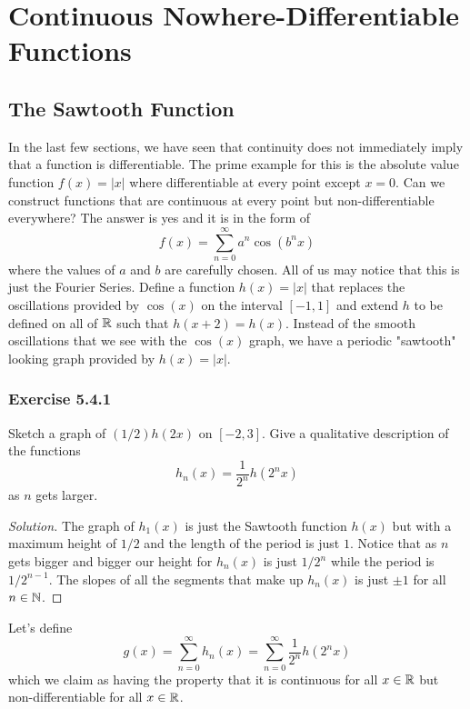 \section{Continuous Nowhere-Differentiable Functions}

\subsection{The Sawtooth Function}

In the last few sections, we have seen that continuity does not immediately imply that a function is differentiable. The prime example for this is the absolute value function \( f(x) = | x  |  \) where differentiable at every point except \(  x = 0  \). Can we construct functions that are continuous at every point but non-differentiable everywhere? The answer is yes and it is in the form of 
\[  f(x) = \sum_{ n = 0 }^{ \infty  } a^n \cos(b^n x) \] where the values of \( a  \) and \( b  \) are carefully chosen. All of us may notice that this is just the Fourier Series. Define a function \( h(x) = | x |  \) that replaces the oscillations provided by \( \cos(x)  \) on the interval \( [-1,1] \) and extend \( h  \) to be defined on all of \( \mathbb{R}  \) such that \( h(x+2) = h(x)   \). Instead of the smooth oscillations that we see with the \( \cos (x)  \) graph, we have a periodic "sawtooth" looking graph provided by \( h(x) = | x |  \).

\subsubsection{Exercise 5.4.1} Sketch a graph of \( (1/2) h(2x)  \) on \( [-2,3]  \). Give a qualitative description of the functions 
\[  h_n(x) = \frac{ 1 }{ 2^n  } h(2^n x ) \]
as \( n  \) gets larger.
\begin{proof}[Solution]
    The graph of \( h_1(x)  \) is just the Sawtooth function \( h(x)  \) but with a maximum height of \( 1/2  \) and the length of the period is just \( 1  \). Notice that as \(  n \) gets bigger and bigger our height for \( h_n(x)  \) is just \( 1 / 2^n  \) while the period is \( 1 / 2^{n-1}  \). The slopes of all the segments that make up \( h_n(x)  \) is just \( \pm 1  \) for all \( n \in \mathbb{N}  \).
\end{proof}
Let's define 
\[  g(x) = \sum_{ n=0  }^{ \infty  } h_n(x) = \sum_{ n=0  }^{ \infty  } \frac{ 1 }{ 2^n  } h(2^n x ) \]
which we claim as having the property that it is continuous for all \( x \in \mathbb{R}  \) but non-differentiable for all \( x \in \mathbb{R}  \).

